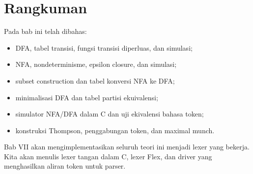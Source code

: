 \section*{Rangkuman}

Pada bab ini telah dibahas:
\begin{itemize}[leftmargin=*]
  \item DFA, tabel transisi, fungsi transisi diperluas, dan simulasi;
  \item NFA, nondeterminisme, epsilon closure, dan simulasi;
  \item subset construction dan tabel konversi NFA ke DFA;
  \item minimalisasi DFA dan tabel partisi ekuivalensi;
  \item simulator NFA/DFA dalam C dan uji ekivalensi bahasa token;
  \item konstruksi Thompson, penggabungan token, dan maximal munch.
\end{itemize}

Bab VII akan mengimplementasikan seluruh teori ini menjadi lexer yang
bekerja. Kita akan menulis lexer tangan dalam C, lexer Flex, dan
driver yang menghasilkan aliran token untuk parser.
